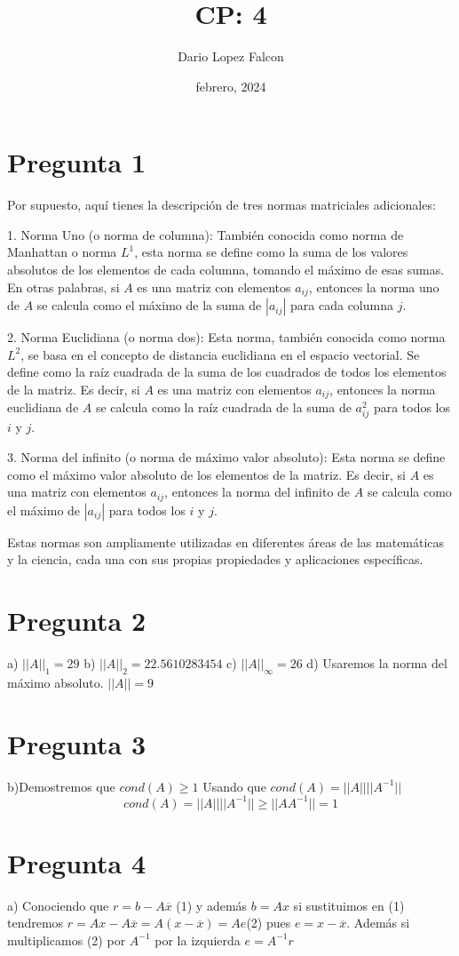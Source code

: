 \documentclass[a4paper,12pt]{article}
\begin{document}
\title{CP: 4}
\author{Dario Lopez Falcon}
\date{febrero, 2024}
\section*{Pregunta 1}
Por supuesto, aquí tienes la descripción de tres normas matriciales adicionales:

1. Norma Uno (o norma de columna): También conocida como norma de Manhattan o norma \( L^1 \), esta norma se define como la suma de los valores absolutos de los elementos de cada columna, tomando el máximo de esas sumas. En otras palabras, si \( A \) es una matriz con elementos \( a_{ij} \), entonces la norma uno de \( A \) se calcula como el máximo de la suma de \( |a_{ij}| \) para cada columna \( j \).

2. Norma Euclidiana (o norma dos): Esta norma, también conocida como norma \( L^2 \), se basa en el concepto de distancia euclidiana en el espacio vectorial. Se define como la raíz cuadrada de la suma de los cuadrados de todos los elementos de la matriz. Es decir, si \( A \) es una matriz con elementos \( a_{ij} \), entonces la norma euclidiana de \( A \) se calcula como la raíz cuadrada de la suma de \( a_{ij}^2 \) para todos los \( i \) y \( j \).

3. Norma del infinito (o norma de máximo valor absoluto): Esta norma se define como el máximo valor absoluto de los elementos de la matriz. Es decir, si \( A \) es una matriz con elementos \( a_{ij} \), entonces la norma del infinito de \( A \) se calcula como el máximo de \( |a_{ij}| \) para todos los \( i \) y \( j \).

Estas normas son ampliamente utilizadas en diferentes áreas de las matemáticas y la ciencia, cada una con sus propias propiedades y aplicaciones específicas.
\section*{Pregunta 2}
a) $||A||_1 = 29$
b) $||A||_2 = 22.5610283454$
c) $||A||_\infty = 26$
d) Usaremos la norma del máximo absoluto.
$||A|| = 9$

\section*{Pregunta 3}

b)Demostremos que $cond(A) \geq 1$
Usando que $cond(A) = ||A|| ||A^{-1}|| $
\[cond(A) = ||A|| ||A^{-1}|| \geq ||A A^{-1}||= 1 \]

\section*{Pregunta 4}
a) Conociendo que $r = b - A\overline{x}$ (1) y además $b = A x$
si sustituimos en (1) tendremos $r = A x - A\overline{x} = A (x - \overline{x}) = A e$(2) pues $e = x - \overline{x}$.
Además si multiplicamos (2) por $A^{-1}$ por la izquierda $e = A^{-1} r$
\end{document}
